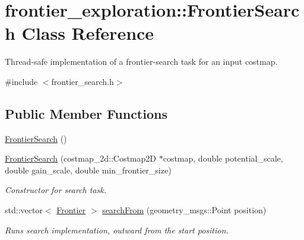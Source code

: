 \hypertarget{classfrontier__exploration_1_1FrontierSearch}{}\section{frontier\+\_\+exploration\+:\+:Frontier\+Search Class Reference}
\label{classfrontier__exploration_1_1FrontierSearch}


Thread-\/safe implementation of a frontier-\/search task for an input costmap.  




{\ttfamily \#include $<$frontier\+\_\+search.\+h$>$}

\subsection*{Public Member Functions}
\begin{DoxyCompactItemize}
\item 
\hyperlink{classfrontier__exploration_1_1FrontierSearch_a3396c0bfc5f1c545ae4be16068eeb620}{Frontier\+Search} ()
\item 
\hyperlink{classfrontier__exploration_1_1FrontierSearch_a0d07b12823e27600de8405d652e9a69a}{Frontier\+Search} (costmap\+\_\+2d\+::\+Costmap2D $\ast$costmap, double potential\+\_\+scale, double gain\+\_\+scale, double min\+\_\+frontier\+\_\+size)
\begin{DoxyCompactList}\small\item\em Constructor for search task. \end{DoxyCompactList}\item 
std\+::vector$<$ \hyperlink{structfrontier__exploration_1_1Frontier}{Frontier} $>$ \hyperlink{classfrontier__exploration_1_1FrontierSearch_ac28ed3ce13ab687ed002f74338189f48}{search\+From} (geometry\+\_\+msgs\+::\+Point position)
\begin{DoxyCompactList}\small\item\em Runs search implementation, outward from the start position. \end{DoxyCompactList}\end{DoxyCompactItemize}
